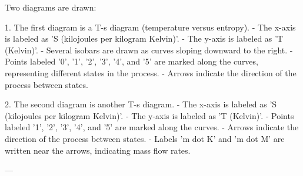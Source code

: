 Two diagrams are drawn:  

1. The first diagram is a T-s diagram (temperature versus entropy).  
   - The x-axis is labeled as 'S (kilojoules per kilogram Kelvin)'.  
   - The y-axis is labeled as 'T (Kelvin)'.  
   - Several isobars are drawn as curves sloping downward to the right.  
   - Points labeled '0', '1', '2', '3', '4', and '5' are marked along the curves, representing different states in the process.  
   - Arrows indicate the direction of the process between states.  

2. The second diagram is another T-s diagram.  
   - The x-axis is labeled as 'S (kilojoules per kilogram Kelvin)'.  
   - The y-axis is labeled as 'T (Kelvin)'.  
   - Points labeled '1', '2', '3', '4', and '5' are marked along the curves.  
   - Arrows indicate the direction of the process between states.  
   - Labels 'm dot K' and 'm dot M' are written near the arrows, indicating mass flow rates.  

---